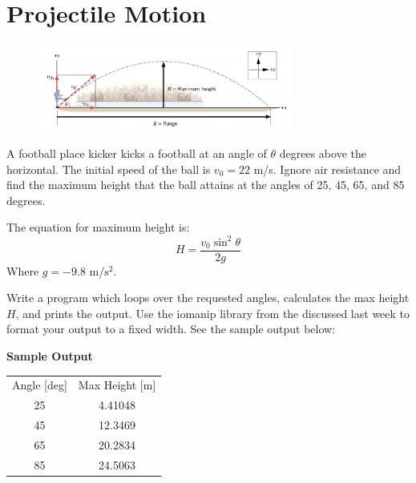 \documentclass{article}
\begin{document}
\section{Projectile Motion}

\begin{figure}[ht!]
	\centering
	\includegraphics[width=0.75\textwidth]{football.png}
\end{figure}

A football place kicker kicks a football at an angle of $\theta$ degrees above the horizontal. The initial speed of the ball is $v_0=22$ m/s. Ignore air resistance and find the maximum height that the ball attains at the angles of 25, 45, 65, and 85 degrees.

The equation for maximum height is:
\begin{equation*}
H=\frac{v_0\sin^2{\theta}}{2g}
\end{equation*}
Where $g=-9.8$ m/$\mathrm{s}^2$.

Write a program which loops over the requested angles, calculates the max height $H$, and prints the output. Use the iomanip library from the discussed last week to format your output to a fixed width. See the sample output below:

\vspace{5cm}
\textbf{Sample Output}
\begin{table}[ht!]
	\begin{tabular}{cc}
		Angle [deg] & Max Height [m]\\
		25&4.41048\\
		45&12.3469\\
		65&20.2834\\
		85&24.5063\\
	\end{tabular}
\end{table}
\end{document}
